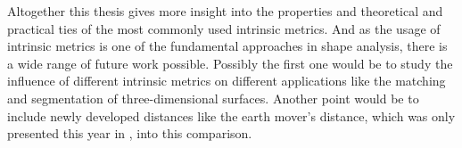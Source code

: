 Altogether this thesis gives more insight into the properties and theoretical and practical ties of the most commonly used intrinsic metrics.
And as the usage of intrinsic metrics is one of the fundamental  approaches in shape analysis, there is a wide range of future work possible.
Possibly the first one would be to study the influence of different intrinsic metrics on different applications like the matching and segmentation of three-dimensional surfaces.
Another point would be to include newly developed distances like the earth mover's distance, which was only presented this year in \cite{solomon2014earth}, into this comparison.
